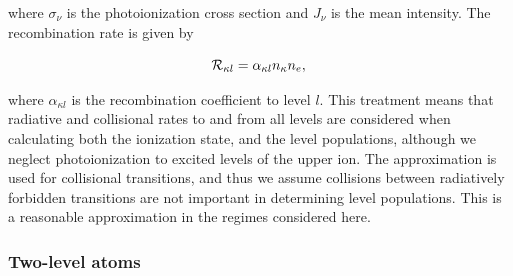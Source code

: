 \documentclass[preprint, a4paper, 11pt]{aastex}
\begin{document}
where $\sigma_{\nu}$ is the photoionization cross section and $J_{\nu}$ is the mean intensity. 
The recombination rate is given by 

\begin{equation}
{\cal R}_{\kappa l} = \alpha_{\kappa l} n_{\kappa} n_e, \\
\end{equation}

where $\alpha_{\kappa l}$ is the recombination
coefficient to level $l$. 
This treatment means that radiative and collisional rates to and from all 
levels are considered when calculating both the ionization state, and the level populations, 
although we neglect photoionization to excited levels of the upper ion. 
The \cite{vanregemorter} approximation is used for collisional transitions,
and thus we assume collisions between radiatively forbidden transitions are
not important in determining level populations.
This is a reasonable approximation in the regimes considered here.

\subsubsection{Two-level atoms}
\end{document}
